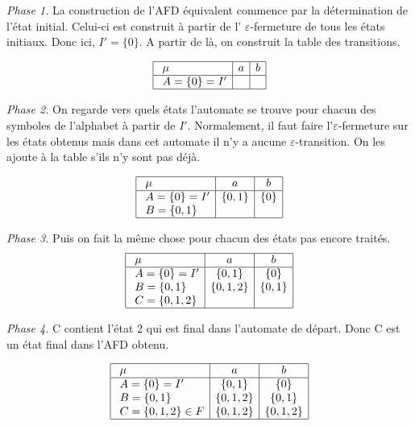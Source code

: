 \begin{corrections}
\begin{questions}
\begin{itemize}
      \emph{Phase 1.}
      La construction de l'AFD équivalent commence par la détermination de l'état initial.
      Celui-ci est construit à partir de l' $\varepsilon$-fermeture de tous les états initiaux.
      Donc ici, $I'=\{0\}$. A partir de là, on construit la table des transitions.
      
      $$\begin{array}{| l | c | c|}
        \hline
        \  \mu & a & b \\
        \hline
        \  A = \{0\} = I' &  &  \\
        \hline
      \end{array}$$
      
      \emph{Phase 2.}
      On regarde vers quels états l'automate se trouve pour chacun des symboles de l'alphabet à partir de $I'$.
      Normalement, il faut faire l'$\varepsilon$-fermeture sur les états obtenus mais dans cet automate il n'y a aucune $\varepsilon$-transition.
      On les ajoute à la table s'ils n'y sont pas déjà.
      
      $$\begin{array}{| l | c | c|}
        \hline
        \  \mu & a & b \\
        \hline
        \  A = \{0\} = I' & \{0,1\} & \{0\} \\
        \  B = \{0,1\} &  &  \\
        \hline
      \end{array}$$
      
      
      \emph{Phase 3.}
      Puis on fait la même chose pour chacun des états pas encore traités.
      $$\begin{array}{| l | c | c|}
        \hline
        \  \mu & a & b \\
        \hline
        \  A = \{0\} = I' & \{0,1\} & \{0\} \\
        \  B = \{0,1\} &  \{0,1,2 \}& \{0,1\}  \\
        \  C = \{0,1,2\} &  &  \\
        \hline
      \end{array}$$
      
      \emph{Phase 4.}
      C contient l'état 2 qui est final dans l'automate de départ. Donc C est un état final dans l'AFD obtenu.
      
      $$\begin{array}{| l | c | c|}
        \hline
        \  \mu & a & b \\
        \hline
        \  A = \{0\} = I' & \{0,1\} & \{0\} \\
        \  B = \{0,1\} &  \{0,1,2 \} & \{0,1\}  \\
        \  C = \{0,1,2\} \in F &  \{0,1,2 \} &  \{0,1,2 \} \\
        \hline
      \end{array}$$
      

\end{itemize}
\end{questions}
\end{corrections}
